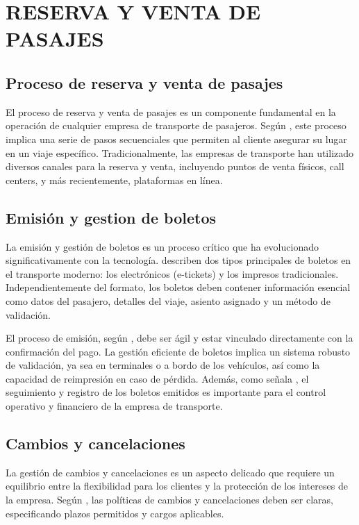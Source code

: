 	\section{RESERVA Y VENTA DE PASAJES}
	\subsection{Proceso de reserva y venta de pasajes}
		El proceso de reserva y venta de pasajes es un componente fundamental en la operación de cualquier empresa de transporte de pasajeros. Según \textcite{aparicio2013gestion}, este proceso implica una serie de pasos secuenciales que permiten al cliente asegurar su lugar en un viaje específico. Tradicionalmente, las empresas de transporte han utilizado diversos canales para la reserva y venta, incluyendo puntos de venta físicos, call centers, y más recientemente, plataformas en línea.	
	\subsection{Emisión y gestion de boletos}
		La emisión y gestión de boletos es un proceso crítico que ha evolucionado significativamente con la tecnología. \textcite{agenjo2008transporte} describen dos tipos principales de boletos en el transporte moderno: los electrónicos (e-tickets) y los impresos tradicionales. Independientemente del formato, los boletos deben contener información esencial como datos del pasajero, detalles del viaje, asiento asignado y un método de validación.
		
		El proceso de emisión, según \textcite{garcía2016gestión}, debe ser ágil y estar vinculado directamente con la confirmación del pago. La gestión eficiente de boletos implica un sistema robusto de validación, ya sea en terminales o a bordo de los vehículos, así como la capacidad de reimpresión en caso de pérdida. Además, como señala \textcite{robuste2005logistica}, el seguimiento y registro de los boletos emitidos es importante para el control operativo y financiero de la empresa de transporte.
	\subsection{Cambios y cancelaciones}
		La gestión de cambios y cancelaciones es un aspecto delicado que requiere un equilibrio entre la flexibilidad para los clientes y la protección de los intereses de la empresa. Según \textcite{tejero2015transporte}, las políticas de cambios y cancelaciones deben ser claras, especificando plazos permitidos y cargos aplicables.
		
